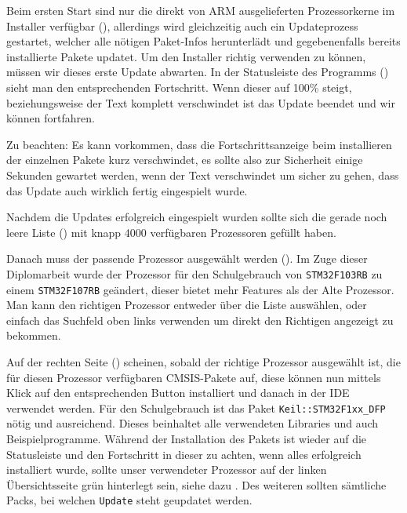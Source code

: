 
Beim ersten Start sind nur die direkt von \gls{ARM} ausgelieferten Prozessorkerne im Installer verfügbar (), allerdings wird gleichzeitig auch ein Updateprozess gestartet, welcher alle nötigen Paket-Infos herunterlädt und gegebenenfalls bereits installierte Pakete updatet. Um den Installer richtig verwenden zu können, müssen wir dieses erste Update abwarten. In der Statusleiste des Programms () sieht man den entsprechenden Fortschritt. Wenn dieser auf 100\% steigt, beziehungsweise der Text komplett verschwindet ist das Update beendet und wir können fortfahren.

\begin{warning}
  Zu beachten: Es kann vorkommen, dass die Fortschrittsanzeige beim installieren der einzelnen Pakete kurz verschwindet, es sollte also zur Sicherheit einige Sekunden gewartet werden, wenn der Text verschwindet um sicher zu gehen, dass das Update auch wirklich fertig eingespielt wurde.
\end{warning}


Nachdem die Updates erfolgreich eingespielt wurden sollte sich die gerade noch leere Liste () mit knapp 4000 verfügbaren Prozessoren gefüllt haben.


Danach muss der passende Prozessor ausgewählt werden (). Im Zuge dieser Diplomarbeit wurde der Prozessor für den Schulgebrauch von \texttt{STM32F103RB} zu einem \texttt{STM32F107RB} geändert, dieser bietet mehr Features als der Alte Prozessor. Man kann den richtigen Prozessor entweder über die Liste auswählen, oder einfach das Suchfeld oben links verwenden um direkt den Richtigen angezeigt zu bekommen.


Auf der rechten Seite () scheinen, sobald der richtige Prozessor ausgewählt ist, die für diesen Prozessor verfügbaren \gls{CMSIS}-Pakete auf, diese können nun mittels Klick auf den entsprechenden Button installiert und danach in der \gls{IDE} verwendet werden. Für den Schulgebrauch ist das Paket \texttt{\gls{Keil}::STM32F1xx\_DFP} nötig und ausreichend. Dieses beinhaltet alle verwendeten Libraries und auch Beispielprogramme. Während der Installation des Pakets ist wieder auf die Statusleiste und den Fortschritt in dieser zu achten, wenn alles erfolgreich installiert wurde, sollte unser verwendeter Prozessor auf der linken Übersichtsseite grün hinterlegt sein, siehe dazu . Des weiteren sollten sämtliche Packs, bei welchen \texttt{Update} steht geupdatet werden.

